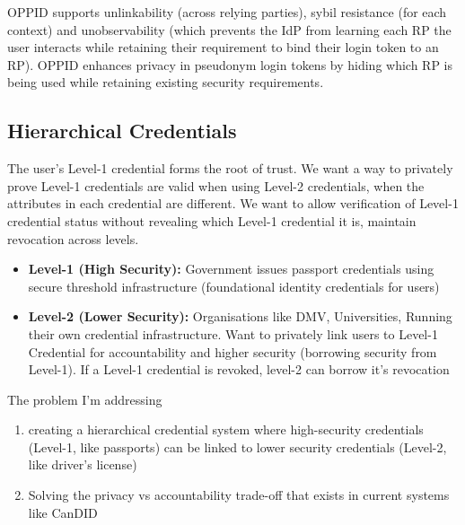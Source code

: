 OPPID \cite{kroschewski_oppid_2024} supports unlinkability (across relying parties), sybil resistance (for each context) and unobservability (which prevents the IdP from learning each RP the user interacts while retaining their requirement to bind their login token to an RP). OPPID enhances privacy in pseudonym login tokens by hiding which RP is being used while retaining existing security requirements.








































\newpage
\subsection{Hierarchical Credentials}

The user's Level-1 credential forms the root of trust.
We want a way to privately prove Level-1 credentials are valid when using Level-2 credentials, when the attributes in each credential are different. We want to allow verification of Level-1 credential status without revealing which Level-1 credential it is, maintain revocation across levels.
\begin{itemize}
    \item \textbf{Level-1 (High Security):} Government issues passport credentials using secure threshold infrastructure (foundational identity credentials for users)
    \item \textbf{Level-2 (Lower Security):} Organisations like DMV, Universities, Running their own credential infrastructure. Want to privately link users to Level-1 Credential for accountability and higher security (borrowing security from Level-1). If a Level-1 credential is revoked, level-2 can borrow it's revocation
\end{itemize}

The problem I'm addressing
\begin{enumerate}
    \item creating a hierarchical credential system where high-security credentials (Level-1, like passports) can be linked to lower security credentials (Level-2, like driver's license)
    \item Solving the privacy vs accountability trade-off that exists in current systems like CanDID
\end{enumerate}


